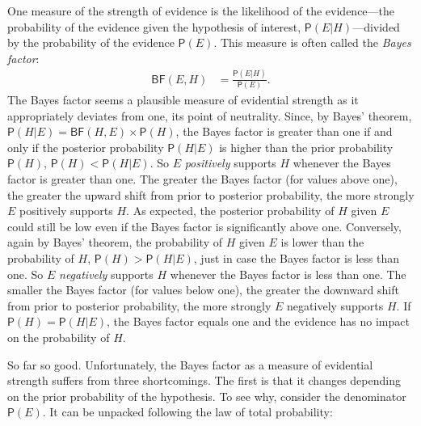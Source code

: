 \documentclass[
  10pt,
  dvipsnames,enabledeprecatedfontcommands]{scrartcl}
\newcommand{\pr}[1]{\mathsf{P}(#1)}
\begin{document}
One measure of the strength of evidence is the likelihood of the
evidence---the probability of the evidence given the hypothesis of
interest, \(\pr{E \vert H}\)---divided by the probability of the
evidence \(\pr{E}\). This measure is often called the
\emph{Bayes factor}: \begin{align}\label{eq:BF}
\tag{BF}
\mathsf{BF}(E,H) & = \frac{\pr{E \vert H}}{\pr{E}}.
\end{align} \noindent The Bayes factor seems a plausible measure of
evidential strength as it appropriately deviates from one, its point of
neutrality. Since, by Bayes' theorem,
\(\pr{H \vert E} = \mathsf{BF}(H, E) \times \pr{H}\), the Bayes factor
is greater than one if and only if the posterior probability
\(\pr{H \vert E}\) is higher than the prior probability \(\pr{H}\),
\(\pr{H}<\pr{H\vert E}\). So \(E\) \textit{positively} supports \(H\)
whenever the Bayes factor is greater than one. The greater the Bayes
factor (for values above one), the greater the upward shift from prior
to posterior probability, the more strongly \(E\) positively supports
\(H\). As expected, the posterior probability of \(H\) given \(E\) could
still be low even if the Bayes factor is significantly above one.
Conversely, again by Bayes' theorem, the probability of \(H\) given
\(E\) is lower than the probability of \(H\), \(\pr{H}>\pr{H\vert E}\),
just in case the Bayes factor is less than one. So \(E\)
\textit{negatively} supports \(H\) whenever the Bayes factor is less
than one. The smaller the Bayes factor (for values below one), the
greater the downward shift from prior to posterior probability, the more
strongly \(E\) negatively supports \(H\). If \(\pr{H}=\pr{H\vert E}\),
the Bayes factor equals one and the evidence has no impact on the
probability of \(H\).

So far so good. Unfortunately, the Bayes factor as a measure of
evidential strength suffers from three shortcomings. The first is that
it changes depending on the prior probability of the hypothesis. To see
why, consider the denominator \(\pr{E}\). It can be unpacked following
the law of total probability:

\vspace{-3mm}
\end{document}
